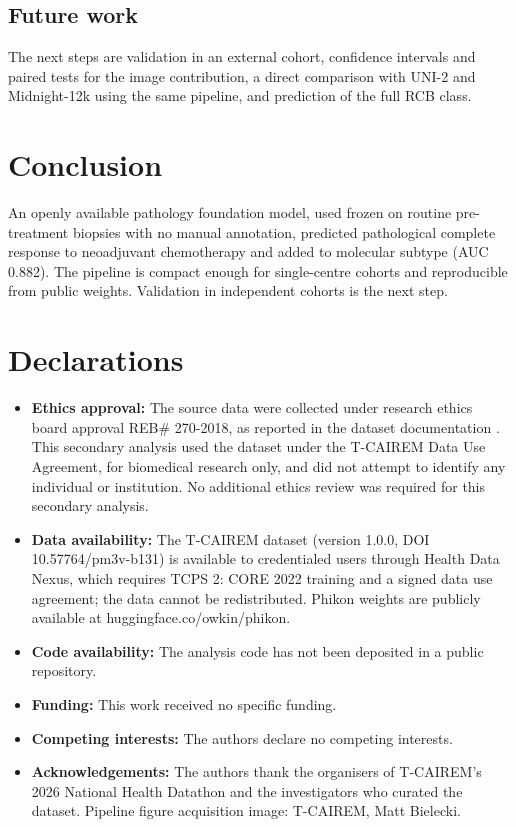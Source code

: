 \documentclass[10pt,a4paper,twocolumn]{article}
\begin{document}
\subsection{Future work}
The next steps are validation in an external cohort, confidence intervals and paired tests for the image contribution, a direct comparison with UNI-2 and Midnight-12k using the same pipeline, and prediction of the full RCB class.

\section{Conclusion}
An openly available pathology foundation model, used frozen on routine pre-treatment biopsies with no manual annotation, predicted pathological complete response to neoadjuvant chemotherapy and added to molecular subtype (AUC 0.882). The pipeline is compact enough for single-centre cohorts and reproducible from public weights. Validation in independent cohorts is the next step.

\section*{Declarations}
\begin{itemize}[nosep]
  \item \textbf{Ethics approval:} The source data were collected under research ethics board approval REB\# 270-2018, as reported in the dataset documentation \cite{tran2025}. This secondary analysis used the dataset under the T-CAIREM Data Use Agreement, for biomedical research only, and did not attempt to identify any individual or institution. No additional ethics review was required for this secondary analysis.
  \item \textbf{Data availability:} The T-CAIREM dataset (version 1.0.0, DOI 10.57764/pm3v-b131) is available to credentialed users through Health Data Nexus, which requires TCPS 2: CORE 2022 training and a signed data use agreement; the data cannot be redistributed. Phikon weights are publicly available at huggingface.co/owkin/phikon.
  \item \textbf{Code availability:} The analysis code has not been deposited in a public repository.
  \item \textbf{Funding:} This work received no specific funding.
  \item \textbf{Competing interests:} The authors declare no competing interests.
  \item \textbf{Acknowledgements:} The authors thank the organisers of T-CAIREM's 2026 National Health Datathon and the investigators who curated the dataset. Pipeline figure acquisition image: T-CAIREM, Matt Bielecki.
\end{itemize}
\end{document}
